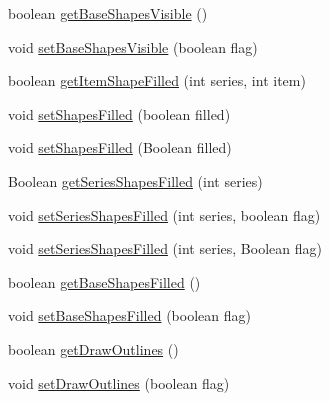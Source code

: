 \begin{DoxyCompactItemize}
\item 
boolean \mbox{\hyperlink{classorg_1_1jfree_1_1chart_1_1renderer_1_1xy_1_1_x_y_line_and_shape_renderer_a5aebca1dfd44e8f4a0a9dee475b5f2f8}{get\+Base\+Shapes\+Visible}} ()
\item 
void \mbox{\hyperlink{classorg_1_1jfree_1_1chart_1_1renderer_1_1xy_1_1_x_y_line_and_shape_renderer_a7bac4d3610108bc67054f37198ad7133}{set\+Base\+Shapes\+Visible}} (boolean flag)
\item 
boolean \mbox{\hyperlink{classorg_1_1jfree_1_1chart_1_1renderer_1_1xy_1_1_x_y_line_and_shape_renderer_a634b9278eae80934f59620923f0a13a6}{get\+Item\+Shape\+Filled}} (int series, int item)
\item 
void \mbox{\hyperlink{classorg_1_1jfree_1_1chart_1_1renderer_1_1xy_1_1_x_y_line_and_shape_renderer_ac3e1932034cb4cb71c252a99ed222f64}{set\+Shapes\+Filled}} (boolean filled)
\item 
void \mbox{\hyperlink{classorg_1_1jfree_1_1chart_1_1renderer_1_1xy_1_1_x_y_line_and_shape_renderer_af181ce73fc2b31121f315583a0e2bab4}{set\+Shapes\+Filled}} (Boolean filled)
\item 
Boolean \mbox{\hyperlink{classorg_1_1jfree_1_1chart_1_1renderer_1_1xy_1_1_x_y_line_and_shape_renderer_a8700a7f72b4dfbcdb1e2a7979a7a0840}{get\+Series\+Shapes\+Filled}} (int series)
\item 
void \mbox{\hyperlink{classorg_1_1jfree_1_1chart_1_1renderer_1_1xy_1_1_x_y_line_and_shape_renderer_abe736bb7be5df64afa42a89fa59d8205}{set\+Series\+Shapes\+Filled}} (int series, boolean flag)
\item 
void \mbox{\hyperlink{classorg_1_1jfree_1_1chart_1_1renderer_1_1xy_1_1_x_y_line_and_shape_renderer_affefe89324f30c646e579244be329c2e}{set\+Series\+Shapes\+Filled}} (int series, Boolean flag)
\item 
boolean \mbox{\hyperlink{classorg_1_1jfree_1_1chart_1_1renderer_1_1xy_1_1_x_y_line_and_shape_renderer_a82f6abe4e086c2e8740b11f5bab8c722}{get\+Base\+Shapes\+Filled}} ()
\item 
void \mbox{\hyperlink{classorg_1_1jfree_1_1chart_1_1renderer_1_1xy_1_1_x_y_line_and_shape_renderer_a74d993dd9113df3bcf97bf8ef533ae35}{set\+Base\+Shapes\+Filled}} (boolean flag)
\item 
boolean \mbox{\hyperlink{classorg_1_1jfree_1_1chart_1_1renderer_1_1xy_1_1_x_y_line_and_shape_renderer_ada74b3f515bd82c1b1a113dd819d7d18}{get\+Draw\+Outlines}} ()
\item 
void \mbox{\hyperlink{classorg_1_1jfree_1_1chart_1_1renderer_1_1xy_1_1_x_y_line_and_shape_renderer_a243b4dca74d9d904b9513977feaf7bcc}{set\+Draw\+Outlines}} (boolean flag)

\end{DoxyCompactItemize}
